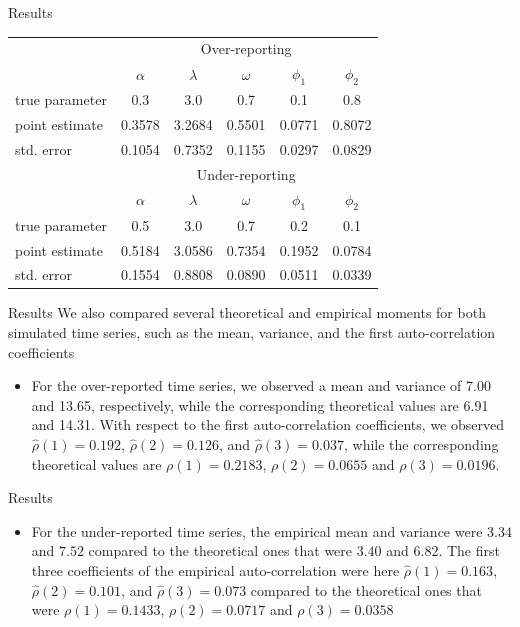 \documentclass[aspectratio=169,usepdftitle=true]{beamer}
\begin{document}
\begin{frame}{Results}
\begin{table}[ht]\small
\begin{center}
\begin{tabular}{lccccc}
\hline
& \multicolumn{5}{c}{Over-reporting}\\
& $\alpha$&$\lambda$&$\omega$&$\phi_1$&$\phi_2$\\
 \hline
true parameter & 0.3 & 3.0 & 0.7& 0.1& 0.8\\
point estimate & 0.3578 & 3.2684 & 0.5501 & 0.0771 &0.8072 \\
std. error &  0.1054 & 0.7352 & 0.1155 & 0.0297 & 0.0829 \\
\hline \hline 
& \multicolumn{5}{c}{Under-reporting}\\
& $\alpha$&$\lambda$&$\omega$&$\phi_1$&$\phi_2$\\
 \hline
true parameter & 0.5 & 3.0 & 0.7& 0.2& 0.1\\
point estimate & 0.5184 & 3.0586 &  0.7354 & 0.1952  & 0.0784 \\
std. error & 0.1554 & 0.8808 & 0.0890 & 0.0511 & 0.0339 \\
\hline 
\end{tabular}
\end{center}
\end{table}
\end{frame}

\begin{frame}{Results}
We also compared several theoretical and empirical moments for both simulated
time series, such as the mean, variance, and the first auto-correlation coefficients
\begin{itemize}
 \item For the over-reported time series, we observed a mean and variance
of 7.00 and 13.65, respectively, while the corresponding theoretical values are 6.91
and 14.31. With respect to the first auto-correlation coefficients, we observed
${\hat \rho}(1) = 0.192$, ${\hat \rho}(2) = 0.126$, and ${\hat \rho}(3) = 0.037$, while the corresponding theoretical
values are $\rho(1) = 0.2183$, $\rho(2) = 0.0655$ and $\rho(3) = 0.0196$.
\end{itemize}
\end{frame}

\begin{frame}{Results}
\begin{itemize}
 \item For the under-reported time series, the empirical mean and variance were $3.34$ and $7.52$ compared to the theoretical ones that were $3.40$ and $6.82$. The first three coefficients of the empirical auto-correlation were here ${\hat \rho}(1)=0.163$, ${\hat \rho}(2)=0.101$, and ${\hat \rho}(3)=0.073$ compared to the theoretical ones that were  $\rho(1)=0.1433$, $\rho(2)=0.0717$ and $\rho(3)=0.0358$
\end{itemize}
\end{frame}
\end{document}
